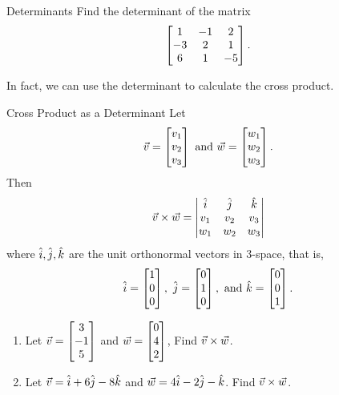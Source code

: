 \begin{exercise}{Determinants}
Find the determinant of the matrix $$\begin{bmatrix}1&-1&2\\-3&2&1\\6&1&-5\end{bmatrix}.$$
\end{exercise}

In fact, we can use the determinant to calculate the cross product.

\begin{claim}{Cross Product as a Determinant}
Let $$\vec{v}=\begin{bmatrix}v_1\\v_2\\v_3\end{bmatrix} \text{ and } \vec{w}=\begin{bmatrix}w_1\\w_2\\w_3\end{bmatrix}.$$ Then $$\vec{v}\times\vec{w}=\begin{vmatrix}\hat{i} & \hat{j} & \hat{k} \\ v_1 & v_2 & v_3 \\ w_1 & w_2 & w_3\end{vmatrix} $$
where $\hat{i}, \hat{j}, \hat{k}$ are the unit orthonormal vectors in 3-space, that is, $$\hat{i}=\begin{bmatrix}1\\0\\0\end{bmatrix}, \ \hat{j}=\begin{bmatrix}0\\1\\0\end{bmatrix}, \text{ and } \hat{k}=\begin{bmatrix}0\\0\\1\end{bmatrix}. $$
\end{claim}

\begin{exercise}{}
\begin{enumerate}
\item Let $\vec{v}=\begin{bmatrix}3\\-1\\5\end{bmatrix}$ and $\vec{w}=\begin{bmatrix}0\\4\\2\end{bmatrix}$, Find $\vec{v}\times\vec{w}$.
\vspace{1em}
\item Let $\vec{v}=\hat{i}+6\hat{j}-8\hat{k}$ and $\vec{w}=4\hat{i}-2\hat{j}-\hat{k}$. Find $\vec{v}\times\vec{w}$.

\end{enumerate}
\end{exercise}


